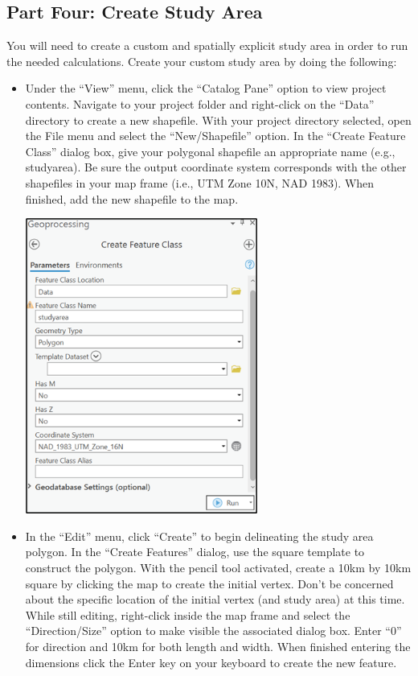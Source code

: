 \documentclass[
  letterpaper,
  DIV=11,
  numbers=noendperiod]{scrartcl}
\begin{document}
\hypertarget{part-four-create-study-area}{%
\subsection{Part Four: Create Study
Area}\label{part-four-create-study-area}}

You will need to create a custom and spatially explicit study area in
order to run the needed calculations. Create your custom study area by
doing the following:

\begin{itemize}
\item
  Under the ``View'' menu, click the ``Catalog Pane'' option to view
  project contents. Navigate to your project folder and right-click on
  the ``Data'' directory to create a new shapefile. With your project
  directory selected, open the File menu and select the
  ``New/Shapefile'' option. In the ``Create Feature Class'' dialog box,
  give your polygonal shapefile an appropriate name (e.g., studyarea).
  Be sure the output coordinate system corresponds with the other
  shapefiles in your map frame (i.e., UTM Zone 10N, NAD 1983). When
  finished, add the new shapefile to the map.

  \includegraphics[width=3in,height=\textheight]{images/paste-D249D986.png}
\item
  In the ``Edit'' menu, click ``Create'' to begin delineating the study
  area polygon. In the ``Create Features'' dialog, use the square
  template to construct the polygon. With the pencil tool activated,
  create a 10km by 10km square by clicking the map to create the initial
  vertex. Don't be concerned about the specific location of the initial
  vertex (and study area) at this time. While still editing, right-click
  inside the map frame and select the ``Direction/Size'' option to make
  visible the associated dialog box. Enter ``0'' for direction and 10km
  for both length and width. When finished entering the dimensions click
  the Enter key on your keyboard to create the new feature.


\end{itemize}
\end{document}
